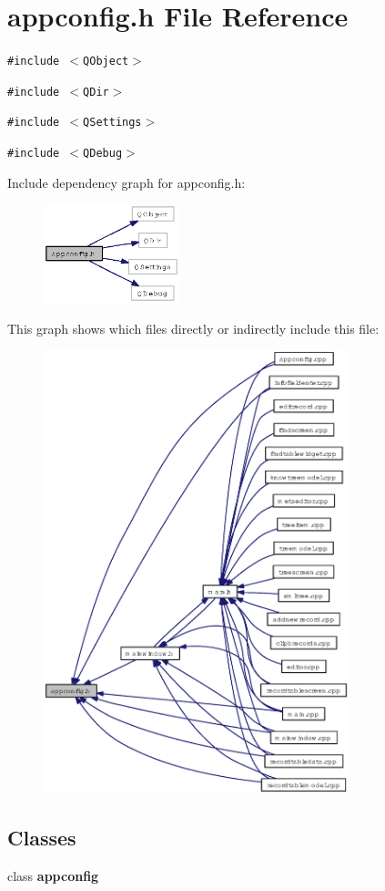 \section{appconfig.h File Reference}
\label{appconfig_8h}
{\tt \#include $<$QObject$>$}\par
{\tt \#include $<$QDir$>$}\par
{\tt \#include $<$QSettings$>$}\par
{\tt \#include $<$QDebug$>$}\par


Include dependency graph for appconfig.h:\begin{figure}[H]
\begin{center}
\leavevmode
\includegraphics[width=112pt]{appconfig_8h__incl}
\end{center}
\end{figure}


This graph shows which files directly or indirectly include this file:\begin{figure}[H]
\begin{center}
\leavevmode
\includegraphics[width=251pt]{appconfig_8h__dep__incl}
\end{center}
\end{figure}
\subsection*{Classes}
\begin{CompactItemize}
\item 
class {\bf appconfig}
\end{CompactItemize}
